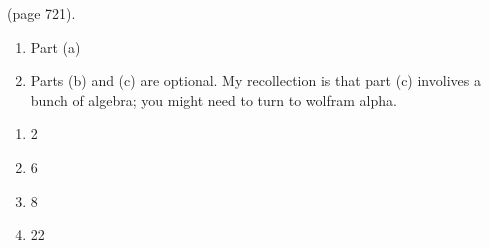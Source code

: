 \documentclass[12pt]{article}
\begin{document}
 (page 721).
\begin{enumerate}
\setlength{\itemsep}{-1mm}
  \item Part (a)
  \item Parts (b) and (c) are optional.  My recollection is that part
    (c) involives a bunch of algebra; you might need to turn to
    wolfram alpha.
\end{enumerate}

\begin{enumerate}
\setlength{\itemsep}{-1mm}
  \item 2
  \item 6
  \item 8
  \item 22
\end{enumerate}
\end{document}
